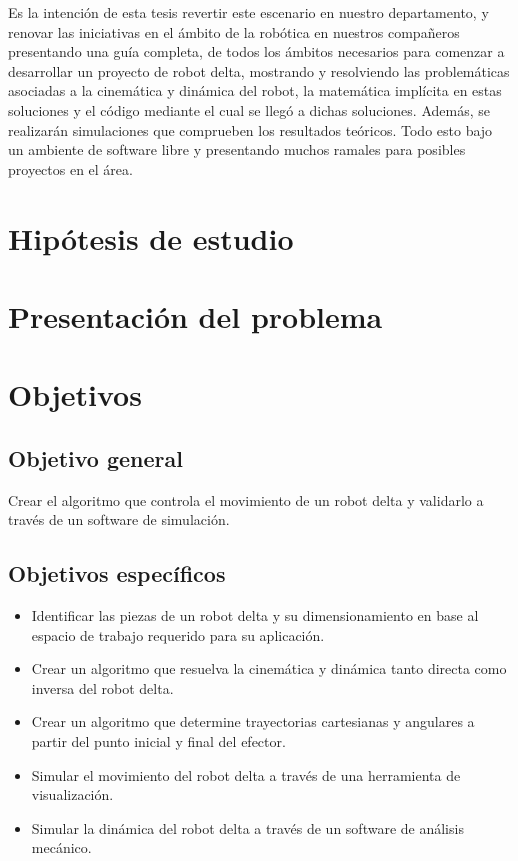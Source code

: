 Es la intención de esta tesis revertir este escenario en nuestro departamento, y renovar las iniciativas en el ámbito de la robótica en nuestros compañeros presentando una guía completa, de todos los ámbitos necesarios para comenzar a desarrollar un proyecto de robot delta, mostrando y resolviendo las problemáticas asociadas a la cinemática y dinámica del robot, la matemática implícita en estas soluciones y el código mediante el cual se llegó a dichas soluciones. Además, se realizarán simulaciones que comprueben los resultados teóricos. Todo esto bajo un ambiente de software libre y presentando muchos ramales para posibles proyectos en el área.

\section{Hipótesis de estudio}

\section{Presentación del problema}

\section{Objetivos}

    \subsection{Objetivo general}
        Crear el algoritmo que controla el movimiento de un robot delta y validarlo a través de un software de simulación.
\subsection{Objetivos específicos}
\begin{itemize}
    \item Identificar las piezas de un robot delta y su dimensionamiento en base al espacio de trabajo
    requerido para su aplicación.
    \item Crear un algoritmo que resuelva la cinemática y dinámica tanto directa como inversa del robot delta.
    \item Crear un algoritmo que determine trayectorias cartesianas y angulares a partir del punto inicial y final del efector.
    \item Simular el movimiento del robot delta a través de una herramienta de visualización.
    \item Simular la dinámica del robot delta a través de un software de análisis mecánico.
\end{itemize}

